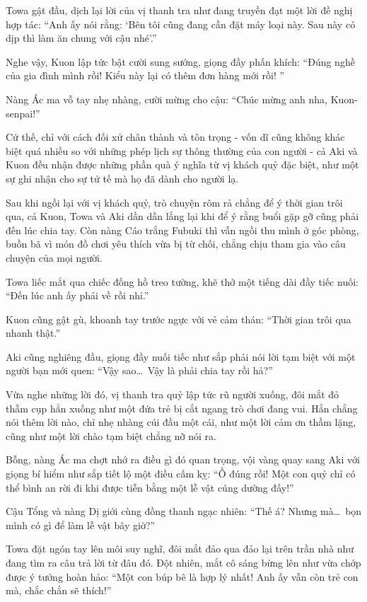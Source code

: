 \documentclass[../main.tex]{subfiles}
\begin{document}
Towa gật đầu, dịch lại lời của vị thanh tra như đang truyền đạt một lời đề nghị hợp tác: ``Anh ấy nói rằng: `Bên tôi cũng đang cần đặt máy loại này. Sau này có dịp thì làm ăn chung với cậu nhé'.''

Nghe vậy, Kuon lập tức bật cười sung sướng, giọng đầy phấn khích: ``Đúng nghề của gia đình mình rồi! Kiểu này lại có thêm đơn hàng mới rồi! ''

Nàng Ác ma vỗ tay nhẹ nhàng, cười mừng cho cậu: ``Chúc mừng anh nha, Kuon-senpai!''

Cứ thế, chỉ với cách đối xử chân thành và tôn trọng - vốn dĩ cũng không khác biệt quá nhiều so với những phép lịch sự thông thường của con người - cả Aki và Kuon đều nhận được những phần quà ý nghĩa từ vị khách quỷ đặc biệt, như một sự ghi nhận cho sự tử tế mà họ đã dành cho người lạ.

\ct

Sau khi ngồi lại với vị khách quỷ, trò chuyện rôm rả chẳng để ý thời gian trôi qua, cả Kuon, Towa và Aki dần dần lắng lại khi để ý rằng buổi gặp gỡ cũng phải đến lúc chia tay. Còn nàng Cáo trắng Fubuki thì vẫn ngồi thu mình ở góc phòng, buồn bã vì món đồ chơi yêu thích vừa bị từ chối, chẳng chịu tham gia vào câu chuyện của mọi người.

Towa liếc mắt qua chiếc đồng hồ treo tường, khẽ thở một tiếng dài đầy tiếc nuối: ``Đến lúc anh ấy phải về rồi nhỉ.''

Kuon cũng gật gù, khoanh tay trước ngực với vẻ cảm thán: ``Thời gian trôi qua nhanh thật.''

Aki cũng nghiêng đầu, giọng đầy nuối tiếc như sắp phải nói lời tạm biệt với một người bạn mới quen: ``Vậy sao\dots\ Vậy là phải chia tay rồi hả?''

Vừa nghe những lời đó, vị thanh tra quỷ lập tức rũ người xuống, đôi mắt đỏ thẫm cụp hẳn xuống như một đứa trẻ bị cắt ngang trò chơi đang vui. Hắn chẳng nói thêm lời nào, chỉ nhẹ nhàng cúi đầu một cái, như một lời cảm ơn thầm lặng, cũng như một lời chào tạm biệt chẳng nỡ nói ra.

Bỗng, nàng Ác ma chợt nhớ ra điều gì đó quan trọng, vội vàng quay sang Aki với giọng bí hiểm như sắp tiết lộ một điều cấm kỵ: ``Ồ đúng rồi! Một con quỷ chỉ có thể bình an rời đi khi được tiễn bằng một lễ vật cúng dường đấy!''

Cậu Tổng và nàng Dị giới cùng đồng thanh ngạc nhiên: ``Thế á? Nhưng mà\dots\ bọn mình có gì để làm lễ vật bây giờ?''

Towa đặt ngón tay lên môi suy nghĩ, đôi mắt đảo qua đảo lại trên trần nhà như đang tìm ra câu trả lời từ đâu đó. Đột nhiên, mắt cô sáng bừng lên như vừa chớp được ý tưởng hoàn hảo: ``Một con búp bê là hợp lý nhất! Anh ấy vẫn còn trẻ con mà, chắc chắn sẽ thích!''
\end{document}

